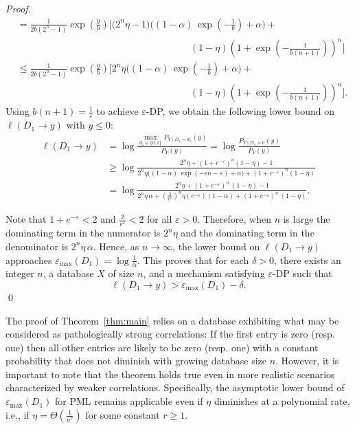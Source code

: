 \begin{proof}
\begin{align*}
    &= \frac{1}{2b (2^{n} -1)} \exp \left(\frac{y}{b} \right) \Bigg[\Big(2^n \eta - 1\Big) \Big( (1 - \alpha)\, \exp \left(-\frac{1}{b}\right) + \alpha \Big) +\\
    &\hspace{18em}(1-\eta) \left(1 + \exp (- \frac{1}{b(n+1)}) \right)^n  \Bigg]\\
    &\leq \frac{1}{2b (2^{n} -1)} \exp \left(\frac{y}{b} \right) \Bigg[2^n  \eta \Big( (1 - \alpha)\, \exp \left(-\frac{1}{b}\right) + \alpha \Big) +\\
    &\hspace{18em} (1-\eta) \left(1 + \exp (- \frac{1}{b(n+1)}) \right)^n  \Bigg]. 
\end{align*}
Using $b(n+1) = \frac{1}{\varepsilon}$ to achieve $\varepsilon$-DP, we obtain the following lower bound on $\ell(D_1 \to y)$ with $y \leq 0$:
\begin{align*}
    \ell(D_1 \to y) &= \log \frac{\max\limits_{d_1 \in \{0,1\}} P_{Y \mid D_1 = d_1}(y)}{P_Y(y)} = \log \frac{P_{Y \mid D_1 = 0}(y)}{P_Y(y)}\\[0.5em]
    &\geq \log \frac{2^n \eta + \left(1 + e^{-\varepsilon} \right)^n (1-\eta) - 1}{2^n  \eta \Big( (1 - \alpha)\, \exp (-\varepsilon  n-\varepsilon) + \alpha \Big) + \left(1 + e^{-\varepsilon} \right)^n (1-\eta)}\\[0.5em]
    &= \log \frac{2^n  \eta +  \left(1 + e^{-\varepsilon} \right)^n \, (1-\eta) - 1}{2^n  \eta \, \alpha  + \left(\frac{2}{e^\varepsilon}\right)^n \eta (e^{-\varepsilon}) (1 - \alpha) +  \left(1 + e^{-\varepsilon} \right)^n \, (1-\eta) }.
 \end{align*}    

Note that $1 + e^{-\varepsilon} < 2$ and $\frac{2}{e^\varepsilon} < 2$ for all $\varepsilon > 0$. Therefore, when $n$ is large the dominating term in the numerator is $2^n \eta$ and the dominating term in the denominator is $2^n \eta \, \alpha$. Hence, as $n \to \infty$, the lower bound on $\ell(D_1 \to y)$ approaches $\varepsilon_\mathrm{max} (D_1) = \log \frac{1}{\alpha}$. This proves that for each $\delta >0$, there exists an integer $n$, a database $X$ of size $n$, and a mechanism satisfying $\varepsilon$-DP such that 
\begin{equation*}
    \ell(D_1 \to y) > \varepsilon_\mathrm{max}(D_1) - \delta.
\end{equation*}
\qed
\end{proof}



The proof of Theorem~\ref{thm:main} relies on a database exhibiting what may be considered as pathologically strong correlations: If the first entry is zero (resp. one) then all other entries are likely to be zero (resp. one) with a constant probability that does not diminish with growing database size $n$. However, it is important to note that the theorem holds true even in more realistic scenarios characterized by weaker correlations. Specifically, the asymptotic lower bound of $\varepsilon_\mathrm{max}(D_1)$ for PML remains applicable even if $\eta$ diminishes at a polynomial rate, i.e., if $\eta = \Theta(\frac{1}{n^r})$ for some constant $r \geq 1$.

